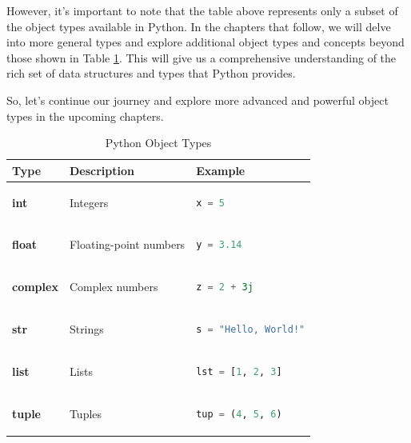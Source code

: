 \documentclass[12pt]{book}
\begin{document}
However, it's important to note that the table above represents only a subset of the object types available in Python. In the chapters that follow, we will delve into more general types and explore additional object types and concepts beyond those shown in Table \ref{tab:python-types}. This will give us a comprehensive understanding of the rich set of data structures and types that Python provides.

So, let's continue our journey and explore more advanced and powerful object types in the upcoming chapters.

\begin{table}[htbp]
\caption{Python Object Types}
\centering
\label{tab:python-types}


\begin{tabular}{|l|l|l|}
\hline
\textbf{Type} & \textbf{Description} & \textbf{Example} \\ \hline
\textbf{int} & Integers & \begin{lstlisting}[language=Python]
x = 5

\end{lstlisting} \\ \hline
\textbf{float} & Floating-point numbers & \begin{lstlisting}[language=Python]
y = 3.14

\end{lstlisting} \\ \hline
\textbf{complex} & Complex numbers & \begin{lstlisting}[language=Python]
z = 2 + 3j

\end{lstlisting} \\ \hline
\textbf{str} & Strings & \begin{lstlisting}[language=Python]
s = "Hello, World!"

\end{lstlisting} \\ \hline
\textbf{list} & Lists & \begin{lstlisting}[language=Python]
lst = [1, 2, 3]

\end{lstlisting} \\ \hline
\textbf{tuple} & Tuples & \begin{lstlisting}[language=Python]
tup = (4, 5, 6)


\end{lstlisting}
\end{tabular}
\end{table}
\end{document}
